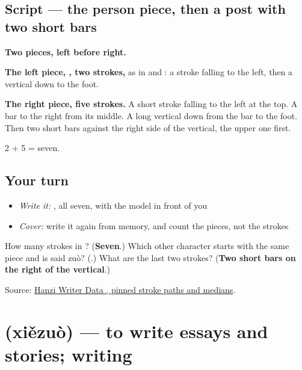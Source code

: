 \subsection*{Script — the person piece, then a post with two short bars}

\begin{quote}
\end{quote}

\textbf{Two pieces, left before right.}

\textbf{The left piece, , two strokes,} as in  and : a stroke falling to the left, then a vertical down to the foot.

\textbf{The right piece, five strokes.} A short stroke falling to the left at the top. A bar to the right from its middle. A long vertical down from the bar to the foot. Then two short bars against the right side of the vertical, the upper one first.

2 + 5 = seven.

\subsection*{Your turn}
\begin{itemize}
\raggedright
  \item \emph{Write it:} , all seven, with the model in front of you
  \item \emph{Cover:} write it again from memory, and count the pieces, not the strokes
\end{itemize}

\begin{tcolorbox}[breakable,colback=teal!4,colframe=teal!35!black,title={Before you move on}]
How many strokes in ? (\textbf{Seven}.) Which other character starts with the same piece and is said zuò? (\textbf{}.) What are the last two strokes? (\textbf{Two short bars on the right of the vertical}.)

Source: \href{https://raw.githubusercontent.com/chanind/hanzi-writer-data/68d10a4b21150cae5e1ebbd223eed289cf32d90c/data/\%E4\%BD\%9C.json}{Hanzi Writer Data , pinned stroke paths and medians}.
\end{tcolorbox}
\section[\texorpdfstring{\zh{写作} (xiězuò)}{写作 (xiězuò)}]{ (xiězuò) — to write essays and stories; writing}

